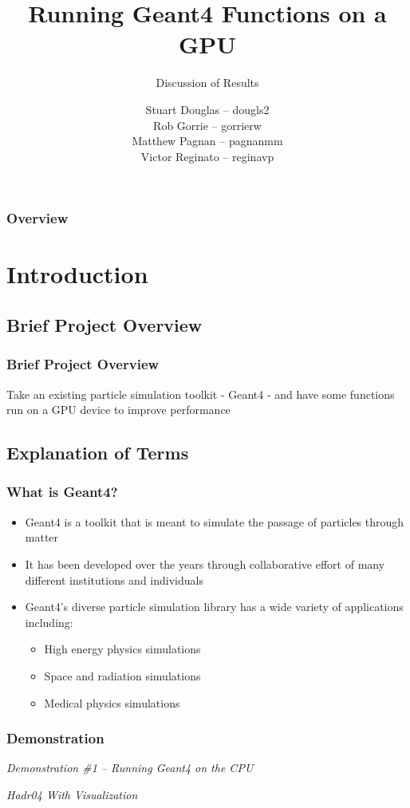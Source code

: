 \documentclass{beamer}
\title[Geant4-GPU (McMaster University)]{Running Geant4 Functions on a GPU}
\subtitle{Discussion of Results}
\institute{McMaster University}
\author[S. Douglas, R. Gorrie, M .Pagnan, V. Reginato]{
Stuart Douglas -- dougls2
\\Rob Gorrie -- gorrierw
\\Matthew Pagnan -- pagnanmm
\\Victor Reginato -- reginavp
}
\begin{document}
\frame{\titlepage}
\begin{frame}
\frametitle{Overview}
\tableofcontents
\end{frame}

\section{Introduction} 

\subsection{Brief Project Overview}
\begin{frame}
\frametitle{Brief Project Overview}
Take an existing particle simulation toolkit - Geant4 - and have some functions run on a GPU device to improve performance
\end{frame}

\subsection{Explanation of Terms}
\begin{frame}
\frametitle{What is Geant4?}
\begin{itemize}
\item Geant4 is a toolkit that is meant to simulate the passage of particles through matter
\item It has been developed over the years through collaborative effort of many different institutions and individuals
\item Geant4's diverse particle simulation library has a wide variety of applications including:
\begin{itemize}
\item High energy physics simulations
\item Space and radiation simulations
\item Medical physics simulations
\end{itemize}
\end{itemize}
\end{frame}

\begin{frame}
\frametitle{Demonstration}
\begin{center}
\emph{Demonstration \#1 -- Running Geant4 on the CPU}

\emph{Hadr04 With Visualization}
\end{center}
\end{frame}
\end{document}
